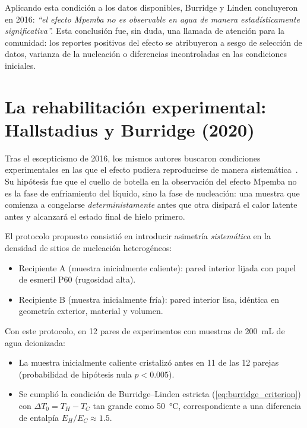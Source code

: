 Aplicando esta condición a los datos disponibles, Burridge y Linden concluyeron 
en 2016: \emph{``el efecto Mpemba no es observable en agua de manera 
estadísticamente significativa''.} Esta conclusión fue, sin duda, una llamada de 
atención para la comunidad: los reportes positivos del efecto se atribuyeron a 
sesgo de selección de datos, varianza de la nucleación o diferencias incontroladas 
en las condiciones iniciales.

\section{La rehabilitación experimental: Hallstadius y Burridge (2020)}

Tras el escepticismo de 2016, los mismos autores buscaron condiciones 
experimentales en las que el efecto pudiera reproducirse de manera 
sistemática~\cite{hallstadius2020}. Su hipótesis fue que el cuello de botella en 
la observación del efecto Mpemba no es la fase de enfriamiento del líquido, sino 
la fase de nucleación: una muestra que comienza a congelarse 
\emph{deterministamente} antes que otra disipará el calor latente antes y 
alcanzará el estado final de hielo primero.

El protocolo propuesto consistió en introducir asimetría \emph{sistemática} en la 
densidad de sitios de nucleación heterogéneos:

\begin{itemize}
\item Recipiente A (muestra inicialmente caliente): pared interior lijada con 
papel de esmeril P\SI{60}{} (rugosidad alta).
\item Recipiente B (muestra inicialmente fría): pared interior lisa, idéntica en 
geometría exterior, material y volumen.
\end{itemize}

\noindent Con este protocolo, en 12 pares de experimentos con muestras de 
\SI{200}{\milli\liter} de agua deionizada:

\begin{itemize}
\item La muestra inicialmente caliente cristalizó antes en \SI{11}{} de las 12 
parejas (probabilidad de hipótesis nula $p < 0.005$).
\item Se cumplió la condición de Burridge--Linden estricta 
(\cref{eq:burridge_criterion}) con $\Delta T_{0} = T_{H} - T_{C}$ tan grande como 
\SI{50}{\celsius}, correspondiente a una diferencia de entalpía 
$E_{H}/E_{C} \approx 1.5$.
\end{itemize}

